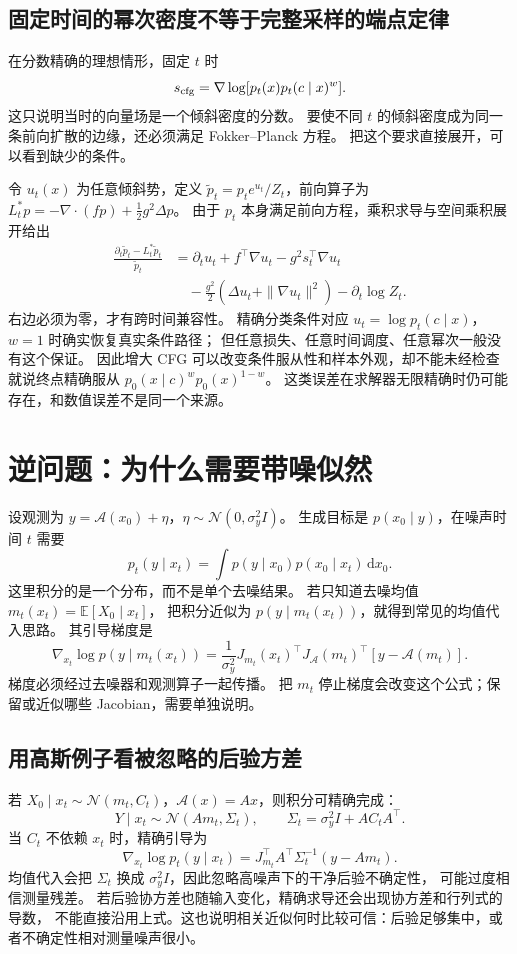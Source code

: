 \subsection{固定时间的幂次密度不等于完整采样的端点定律}
在分数精确的理想情形，固定 $t$ 时
\[
s_{\rm cfg}=\nabla\log[p_t(x)p_t(c\mid x)^w].
\]
这只说明当时的向量场是一个倾斜密度的分数。
要使不同 $t$ 的倾斜密度成为同一条前向扩散的边缘，还必须满足 Fokker--Planck 方程。
把这个要求直接展开，可以看到缺少的条件。

令 $u_t(x)$ 为任意倾斜势，定义
$\tilde p_t=p_te^{u_t}/Z_t$，前向算子为
$L_t^*p=-\nabla\cdot(fp)+\tfrac12g^2\Delta p$。
由于 $p_t$ 本身满足前向方程，乘积求导与空间乘积展开给出
\begin{align}
\frac{\partial_t\tilde p_t-L_t^*\tilde p_t}{\tilde p_t}
 &=\partial_tu_t+f^\top\nabla u_t-g^2s_t^\top\nabla u_t\\
 &\quad-\frac{g^2}{2}(\Delta u_t+\|\nabla u_t\|^2)
 -\partial_t\log Z_t.
\label{supp:tilt-residual}
\end{align}
右边必须为零，才有跨时间兼容性。
精确分类条件对应 $u_t=\log p_t(c\mid x)$，$w=1$ 时确实恢复真实条件路径；
但任意损失、任意时间调度、任意幂次一般没有这个保证。
因此增大 CFG 可以改变条件服从性和样本外观，却不能未经检查就说终点精确服从
$p_0(x\mid c)^w p_0(x)^{1-w}$。
这类误差在求解器无限精确时仍可能存在，和数值误差不是同一个来源。

\section{逆问题：为什么需要带噪似然}
设观测为 $y=\mathcal A(x_0)+\eta$，$\eta\sim\mathcal N(0,\sigma_y^2I)$。
生成目标是 $p(x_0\mid y)$，在噪声时间 $t$ 需要
\[
p_t(y\mid x_t)=\int p(y\mid x_0)p(x_0\mid x_t)\,\mathrm dx_0.
\label{supp:noisy-likelihood}
\]
这里积分的是一个分布，而不是单个去噪结果。
若只知道去噪均值 $m_t(x_t)=\mathbb E[X_0\mid x_t]$，
把积分近似为 $p(y\mid m_t(x_t))$，就得到常见的均值代入思路。
其引导梯度是
\[
\nabla_{x_t}\log p(y\mid m_t(x_t))
=\frac1{\sigma_y^2}J_{m_t}(x_t)^\top
 J_{\mathcal A}(m_t)^\top[y-\mathcal A(m_t)].
\]
梯度必须经过去噪器和观测算子一起传播。
把 $m_t$ 停止梯度会改变这个公式；保留或近似哪些 Jacobian，需要单独说明。

\subsection{用高斯例子看被忽略的后验方差}
若 $X_0\mid x_t\sim\mathcal N(m_t,C_t)$，$\mathcal A(x)=Ax$，则积分可精确完成：
\[
Y\mid x_t\sim\mathcal N(Am_t,\Sigma_t),\qquad
\Sigma_t=\sigma_y^2I+AC_tA^\top.
\]
当 $C_t$ 不依赖 $x_t$ 时，精确引导为
\[
\nabla_{x_t}\log p_t(y\mid x_t)
=J_{m_t}^\top A^\top\Sigma_t^{-1}(y-Am_t).
\]
均值代入会把 $\Sigma_t$ 换成 $\sigma_y^2I$，因此忽略高噪声下的干净后验不确定性，
可能过度相信测量残差。
若后验协方差也随输入变化，精确求导还会出现协方差和行列式的导数，
不能直接沿用上式。这也说明相关近似何时比较可信：后验足够集中，或者不确定性相对测量噪声很小。

